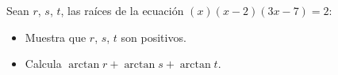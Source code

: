 Sean $r$, $s$, $t$, las raíces de la ecuación $(x)(x-2)(3x-7)=2$:
 \begin{itemize} 
 \item  Muestra que $r$, $s$, $t$ son positivos.
 \item  Calcula $\arctan r+\arctan s+\arctan t$.
 \end{itemize} 
